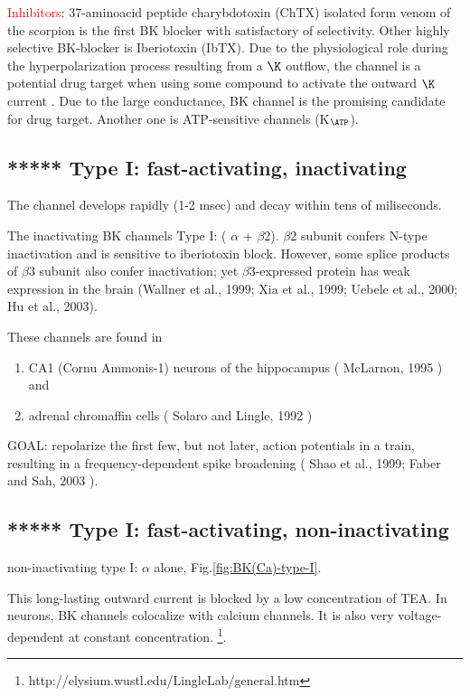 \textcolor{red}{Inhibitors}: 37-aminoacid peptide charybdotoxin (ChTX) isolated
form venom of the scorpion is the first BK blocker with satisfactory of
selectivity. Other highly selective BK-blocker is Iberiotoxin (IbTX). Due to the
physiological role during the hyperpolarization process resulting from a $\K$
outflow, the channel is a potential drug target when using some compound to
activate the outward $\K$ current \citep{calderone2002}. Due to the large
conductance, BK channel is the promising candidate for drug target.
Another one is ATP-sensitive channels (K$_\ATP$).


\subsection{***** Type I: fast-activating, inactivating}

The channel develops rapidly (1-2 msec) and
decay within tens of miliseconds.

The inactivating BK channels Type I: ( $\alpha$ + $\beta$2).
$\beta$2 subunit confers N-type inactivation and  is sensitive to iberiotoxin
block. However, some splice products of $\beta$3 subunit also confer
inactivation; yet $\beta$3-expressed protein has weak expression in the brain
(Wallner et al., 1999; Xia et al., 1999; Uebele et al., 2000; Hu et al., 2003).

These channels are found in
\begin{enumerate}
  
  \item  CA1 (Cornu Ammonis-1) neurons of the hippocampus ( McLarnon, 1995 ) and
  
  \item adrenal chromaffin cells ( Solaro and Lingle, 1992 )
\end{enumerate}

GOAL: repolarize the first few, but not later, action potentials in a train,
resulting in a frequency-dependent spike broadening ( Shao et al., 1999; Faber
and Sah, 2003 ).



\subsection{***** Type I: fast-activating, non-inactivating}

non-inactivating type I: $\alpha$ alone, Fig.\ref{fig:BK(Ca)-type-I}.

This long-lasting outward current is blocked by a low concentration of TEA.
In neurons, BK channels colocalize with calcium  channels. It is also very
voltage-dependent at constant  concentration.
\footnote{http://elysium.wustl.edu/LingleLab/general.htm}.

